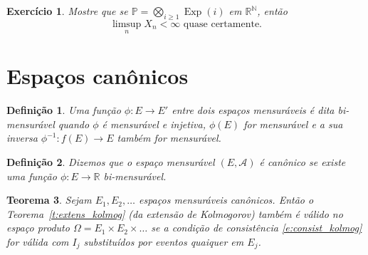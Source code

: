 \documentclass[reqno]{article}
\newcommand*\1{\mathds{1}}
\newtheorem{theorem}{Teorema}[section]
\newtheorem{definition}[theorem]{Definição}
\DeclareMathOperator{\Exp}{Exp}
\newtheorem{exercise}[example]{Exercício}
\begin{document}
\begin{exercise}
  Mostre que se $\mathbb{P} = \bigotimes_{i \geq 1} \Exp(i)$ em $\mathbb{R}^\mathbb{N}$, então
  \begin{equation}
    \text{$\limsup_n X_n < \infty$ quase certamente.}
  \end{equation}
\end{exercise}

\newpage

\section{Espaços canônicos}


\begin{definition}
  Uma função $\phi:E \to E'$ entre dois espaços mensuráveis é dita bi-mensurável quando $\phi$ é mensurável e injetiva, $\phi(E)$ for mensurável e a sua inversa $\phi^{-1}:f(E) \to E$ também for mensurável.
\end{definition}

\begin{definition}
  Dizemos que o espaço mensurável $(E, \mathcal{A})$ é canônico se existe uma função $\phi: E \to \mathbb{R}$ bi-mensurável.
\end{definition}

\begin{theorem}
  Sejam $E_1, E_2, \dots$ espaços mensuráveis canônicos.
  Então o Teorema~\ref{t:extens_kolmog} (da extensão de Kolmogorov) também é válido no espaço produto $\Omega = E_1 \times E_2 \times \dots$ se a condição de consistência \eqref{e:consist_kolmog} for válida com $I_j$ substituídos por eventos quaiquer em $E_j$.
\end{theorem}
\end{document}
